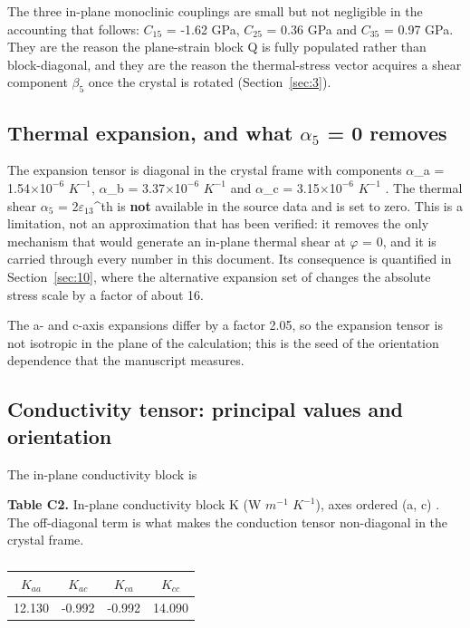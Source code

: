 \documentclass[preprint,12pt]{elsarticle}
\begin{document}
The three in-plane monoclinic couplings are small but not negligible in the accounting that follows: $C_{15}$ = -1.62 GPa, $C_{25}$ = 0.36 GPa and $C_{35}$ = 0.97 GPa. They are the reason the plane-strain block Q is fully populated rather than block-diagonal, and they are the reason the thermal-stress vector acquires a shear component $\beta_{5}$ once the crystal is rotated (Section~\ref{sec:3}).

\subsection{Thermal expansion, and what $\alpha_{5}$ = 0 removes}
\label{sec:1.3}

The expansion tensor is diagonal in the crystal frame with components $\alpha$\_a = 1.54$\times$1$0^{-6}$ $K^{-1}$, $\alpha$\_b = 3.37$\times$1$0^{-6}$ $K^{-1}$ and $\alpha$\_c = 3.15$\times$1$0^{-6}$ $K^{-1}$ \cite{chandra1998}. The thermal shear $\alpha_{5}$ = 2$\varepsilon_{13}$^{th} is \textbf{not} available in the source data and is set to zero. This is a limitation, not an approximation that has been verified: it removes the only mechanism that would generate an in-plane thermal shear at $\varphi$ = 0, and it is carried through every number in this document. Its consequence is quantified in Section~\ref{sec:10}, where the alternative expansion set of \cite{huang2025} changes the absolute stress scale by a factor of about 16.

The a- and c-axis expansions differ by a factor 2.05, so the expansion tensor is not isotropic in the plane of the calculation; this is the seed of the orientation dependence that the manuscript measures.

\subsection{Conductivity tensor: principal values and orientation}
\label{sec:1.4}

The in-plane conductivity block is

\textbf{Table C2.} In-plane conductivity block K (W $m^{-1}$ $K^{-1}$), axes ordered (a, c) \cite{tzou1995}. The off-diagonal term is what makes the conduction tensor non-diagonal in the crystal frame.

\begin{table}[htbp]
\centering
\caption{}
\label{tab:?}
\begin{tabular}{cccc}
\toprule
$K_{aa}$ & $K_{ac}$ & $K_{ca}$ & $K_{cc}$ \\
\midrule
12.130 & -0.992 & -0.992 & 14.090 \\
\bottomrule
\end{tabular}
\end{table}
\end{document}
